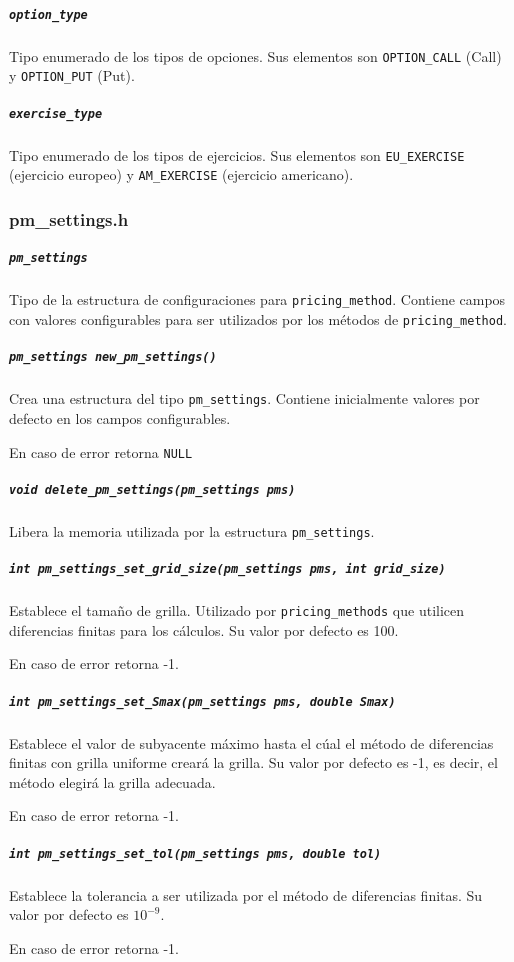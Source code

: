 \documentclass[12pt,a4paper,final]{article}
\begin{document}
			\subparagraph{\texttt{option\_type}}
				Tipo enumerado de los tipos de opciones. Sus elementos son \texttt{OPTION\_CALL} (Call) y 
				\texttt{OPTION\_PUT} (Put).
				
			\subparagraph{\texttt{exercise\_type}}
				Tipo enumerado de los tipos de ejercicios. Sus elementos son
				\texttt{EU\_EXERCISE} (ejercicio europeo) y \texttt{AM\_EXERCISE} (ejercicio americano).
				
		\subsubsection{pm\_settings.h}
			
			\subparagraph{\texttt{pm\_settings}}
				Tipo de la estructura de configuraciones para \texttt{pricing\_method}.
				Contiene campos con valores configurables para ser utilizados por los
				métodos de \texttt{pricing\_method}.
		
			\subparagraph{\texttt{pm\_settings new\_pm\_settings()}}
				Crea una estructura del tipo \texttt{pm\_settings}. Contiene inicialmente
				valores por defecto en los campos configurables.
				
				En caso de error retorna \texttt{NULL}
				
			\subparagraph{\texttt{void delete\_pm\_settings(pm\_settings pms)}}
				Libera la memoria utilizada por la estructura \texttt{pm\_settings}.
				
			\subparagraph{\texttt{int pm\_settings\_set\_grid\_size(pm\_settings pms, int grid\_size)}}
				Establece el tamaño de grilla. Utilizado por \texttt{pricing\_methods} que utilicen diferencias
				finitas para los cálculos. Su valor por defecto es 100.
				
				En caso de error retorna -1.
				
			\subparagraph{\texttt{int pm\_settings\_set\_Smax(pm\_settings pms, double Smax)}}
				Establece el valor de subyacente máximo hasta el cúal el método de diferencias finitas
				con grilla uniforme creará la grilla. Su valor por defecto es -1, es decir, el método
				elegirá la grilla adecuada.
				
				En caso de error retorna -1.
				
			\subparagraph{\texttt{int pm\_settings\_set\_tol(pm\_settings pms, double tol)}}
				Establece la tolerancia a ser utilizada por el método de diferencias finitas.
				Su valor por defecto es $10^{-9}$.			
				
				En caso de error retorna -1.
			
\end{document}
